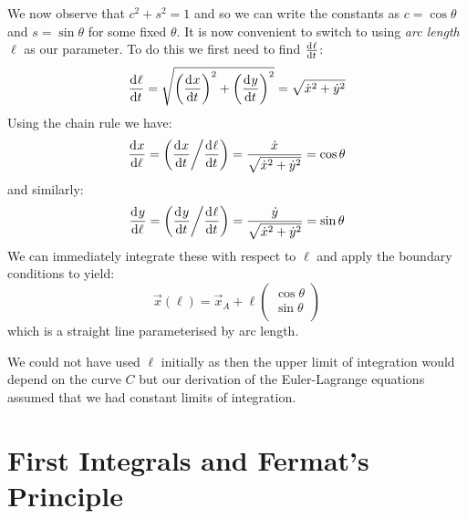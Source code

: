 \documentclass[../main.tex]{subfiles}
\begin{document}
We now observe that $c^2 + s^2 = 1$ and so we can write the constants as $c = \cos \theta$ and $s = \sin \theta$ for some fixed $\theta$.
It is now convenient to switch to using \textit{arc length} $\ell$ as our parameter.
To do this we first need to find $\deriv{\ell}{t}$:
\[
  \deriv{\ell}{t} = \sqrt{\left(\deriv{x}{t}\right)^2 + \left(\deriv{y}{t}\right)^2} = \sqrt{\dot{x}^2 + \dot{y}^2}
\]
Using the chain rule we have:
\[
  \deriv{x}{\ell} = \left(\deriv{x}{t} \middle/ \deriv{\ell}{t} \right) = \frac{\dot{x}}{\sqrt{\dot{x}^2 + \dot{y}^2}} = \cos \theta
\]
and similarly:
\[
  \deriv{y}{\ell} = \left(\deriv{y}{t} \middle/ \deriv{\ell}{t} \right) = \frac{\dot{y}}{\sqrt{\dot{x}^2 + \dot{y}^2}} = \sin \theta
\]
We can immediately integrate these with respect to $\ell$ and apply the boundary conditions to yield:
\[
  \vec{x}(\ell) = \vec{x}_{A} + \ell \begin{pmatrix}
  \cos \theta \\
  \sin \theta \\
  \end{pmatrix}
\]
which is a straight line parameterised by arc length.
\begin{remark}
  We could not have used $\ell$ initially as then the upper limit of integration would depend on the curve $C$ but our derivation of the Euler-Lagrange equations assumed that we had constant limits of integration.
\end{remark}
\section{First Integrals and Fermat's Principle}
\end{document}
